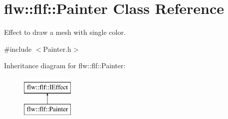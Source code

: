 \hypertarget{classflw_1_1flf_1_1Painter}{}\section{flw\+:\+:flf\+:\+:Painter Class Reference}
\label{classflw_1_1flf_1_1Painter}


Effect to draw a mesh with single color.  




{\ttfamily \#include $<$Painter.\+h$>$}

Inheritance diagram for flw\+:\+:flf\+:\+:Painter\+:\begin{figure}[H]
\begin{center}
\leavevmode
\includegraphics[height=2.000000cm]{classflw_1_1flf_1_1Painter}
\end{center}
\end{figure}
